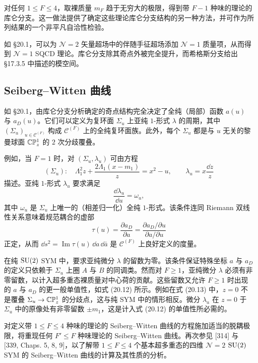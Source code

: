 \begin{remark}[20.23]
对任何 $1\le F\le4$，取裸质量 $m_F$ 趋于无穷大的极限，得到带 $F-1$ 种味的理论的库仑分支。这一做法提供了确定这些理论库仑分支结构的另一种方法，并可作为所列结果的一个非平凡自洽性检验。
\end{remark}

如 §20.1，可以为 $\mathcal{N}=2$ 矢量超场中的伴随手征超场添加 $\mathcal{N}=1$ 质量项，从而得到 $\mathcal{N}=1$ SQCD 理论。库仑分支除其奇点外被完全提升，而希格斯分支给出 §17.3.5 中描述的模空间。

\subsection{Seiberg–Witten 曲线}

如 §20.1，由库仑分支分析确定的奇点结构完全决定了全纯（局部）函数 $a(u)$ 与 $a_D(u)$。它们可以定义为复环面 $\Sigma_u$ 上亚纯 $1$-形式 $\lambda$ 的周期，其中 $(\Sigma_u)_{u\in\mathcal{C}^{(F)}}$ 构成 $\mathcal{C}^{(F)}$ 上的全纯复环面族。此外，每个 $\Sigma_u$ 都是与 $u$ 无关的黎曼球面 $\mathbb{C}\mathbb{P}^1_z$ 的 $2$ 次分歧覆叠。

例如，当 $F=1$ 时，对 $(\Sigma_u,\lambda_u)$ 可由方程
\begin{equation}
(\Sigma_u):\quad \Lambda_1^2z+\frac{2\Lambda_1(x-m_1)}{z}=x^2-u,\qquad
\lambda_u=x\frac{\dd z}{z}
\tag{20.13}
\end{equation}
描述。亚纯 $1$-形式 $\lambda_u$ 要求满足
\[
\frac{\dd\lambda_u}{\dd u}=\omega_u,
\]
其中 $\omega_u$ 是 $\Sigma_u$ 上唯一的（相差归一化）全纯 $1$-形式。该条件连同 Riemann 双线性关系意味着规范耦合的虚部
\[
\tau(u)=\frac{\partial a_D}{\partial a}=\frac{\partial a_D/\partial u}{\partial a/\partial u}
\]
正定，从而 $\dd s^2=\operatorname{Im}\tau(u)\,\dd a\,\dd\bar a$ 是 $\mathcal{C}^{(F)}$ 上良好定义的度量。

\begin{remark}[20.24]
在纯 $\operatorname{SU}(2)$ SYM 中，要求亚纯微分 $\lambda$ 的留数为零。该条件保证特殊坐标 $a$ 与 $a_D$ 的定义只依赖于 $\Sigma_u$ 上圈 $A$ 与 $B$ 的同调类。然而对 $F\ge1$，亚纯微分 $\lambda$ 必须有非零留数，以计入超多重态裸质量对中心荷的贡献。这些留数又允许 $F\ge1$ 时出现的 $a$ 与 $a_D$ 的更一般单值性，如式 (20.12) 所示。例如在式 (20.13) 中，$z=0$ 不是覆叠 $\Sigma_u\to\mathbb{C}\mathbb{P}^1_z$ 的分歧点，这与纯 SYM 中的情形相反。微分 $\lambda_u$ 在 $z=0$ 于 $\Sigma_u$ 中的原像处有非零留数 $\pm m_1$，这是计入式 (20.12) 的单值性所必需的。
\end{remark}

对定义带 $1\le F\le4$ 种味的理论的 Seiberg--Witten 曲线的方程施加适当的脱耦极限，将重现任何 $F'\le F$ 种味理论的 Seiberg--Witten 曲线。再次参见 [314] 与 [339, Chaps. 5, 8, 9]，以了解带 $1\le F\le4$ 个基本超多重态的四维 $\mathcal{N}=2$ $\operatorname{SU}(2)$ SYM 的 Seiberg--Witten 曲线的计算及其性质的分析。

